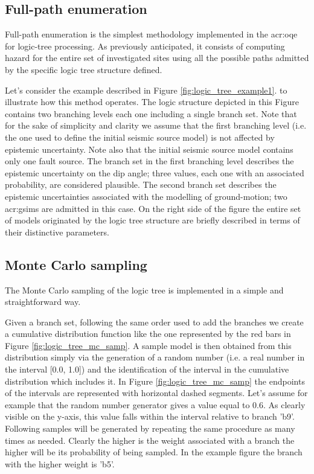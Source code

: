 \subsection{Full-path enumeration}
Full-path enumeration is the simplest methodology implemented in the
\gls{acr:oqe} for logic-tree processing. 
%
As previously anticipated, it consists of computing hazard 
for the entire set of investigated sites using all the possible paths 
admitted by the specific logic tree structure defined.

Let's consider the example described in Figure \ref{fig:logic_tree_example1}.
to illustrate how this method operates.
%
The logic structure depicted in this Figure contains two branching 
levels each one including a single branch set. 
%
Note that for the sake of simplicity and clarity we assume that the first 
branching level (i.e. the one used to define the initial seismic source 
model) is not affected by epistemic uncertainty. 
%
Note also that the initial seismic source model contains only one fault 
source.
%
The branch set in the first branching level describes the epistemic 
uncertainty on the dip angle; three values, each one with an associated 
probability, are considered plausible. 
%
The second branch set describes the epistemic uncertainties associated with 
the modelling of ground-motion; two \glspl{acr:gsim} are admitted in this
case. 
%
On the right side of the figure the entire set of models originated by the 
logic tree structure are briefly described in terms of their 
distinctive parameters.
\subsection{Monte Carlo sampling}
The Monte Carlo sampling of the logic tree is implemented in a simple and 
straightforward way. 

Given a branch set, following the same order used to add the branches 
we create a cumulative distribution function like the one represented 
by the red bars in Figure \ref{fig:logic_tree_mc_samp}. 
%
A sample model is then obtained from this distribution simply via the 
generation of a random number (i.e. a real number in the interval 
[0.0, 1.0]) and the identification of the interval in the cumulative 
distribution which includes it. In Figure \ref{fig:logic_tree_mc_samp}
the endpoints of the intervals are represented with horizontal dashed
segments. Let's assume for example that the random number generator
gives a value equal to 0.6. As clearly visible on the y-axis,
this value falls within the interval relative to branch 'b9'. 
%
Following samples will be generated by repeating the same procedure as
many times as needed. Clearly the higher is the weight associated with 
a branch the higher will be its probability of being sampled. In the 
example figure the branch with the higher weight is 'b5'.

